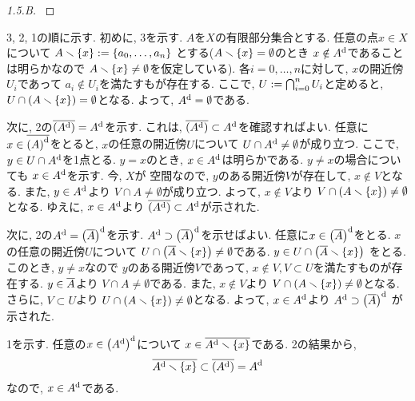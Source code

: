 \documentclass[uplatex, dvipdfmx, a4paper, 12pt, class=jsarticle, crop=false]{standalone}
\begin{document}
\begin{proof}[1.5.B]\label{eng-1-5-B-proof}

\end{proof}
	3, 2, 1の順に示す.
	初めに, 3を示す.
	\( A \)を\( X \)の有限部分集合とする.
	任意の点\( x \in X \)について
	\( A \setminus \lrbrace{x} \defeq \lrbrace{a_0, \ldots, a_n} \)
	とする(\( A \setminus \lrbrace{x} = \emptyset \)のとき
	\( x \notin A^{\mathrm{d}} \)であることは明らかなので
	\( A \setminus \lrbrace{x} \neq \emptyset \)を仮定している).
	各\( i = 0, \ldots, n \)に対して,
	\( x \)の開近傍\( U_i \)であって
	\( a_i \notin U_i \)を満たすもが存在する.
	ここで, \( U \mathrel{:=} \bigcap_{i=0}^n U_i \)と定めると,
	\( U \cap \lrparen{A \setminus \lrbrace{x}} = \emptyset \)となる.
	よって, \( A^{\mathrm{d}} = \emptyset \)である.

	次に, 2の\( \topbar{\lrparen{A^\topd}} = A^\topd \)を示す.
	これは, \( \topbar{\lrparen{A^\topd}}
	\subset A^\topd \)を確認すればよい.
	任意に\( x \in \topbar{\lrparen{A}^\topd} \)をとると,
	\( x \)の任意の開近傍\( U \)について
	\( U \cap A^{\mathrm{d}} \neq \emptyset \)が成り立つ.
	ここで, \( y \in U \cap A^{\mathrm{d}} \)を1点とる.
	\( y = x \)のとき, \( x \in A^{\mathrm{d}} \)は明らかである.
	\( y \neq x \)の場合についても
	\( x \in A^{\mathrm{d}} \)を示す.
	今, \( X \)が 空間なので,
	\( y \)のある開近傍\( V \)が存在して,
	\( x \notin V \)となる.
	また, \( y \in A^{\mathrm{d}} \)より
	\( V \cap A \neq \emptyset \)が成り立つ.
	よって, \( x \notin V \)より
	\( V \cap \lrparen{A \setminus \lrbrace{x}}
	\neq \emptyset \)となる.
	ゆえに, \( x \in A^{\mathrm{d}} \)より
	\( \topbar{\lrparen{A^\topd}}
	\subset A^\topd \)が示された.

	次に, 2の\( A^\topd = \lrparen{\topbar{A}}^\topd \)を示す.
	\( A^\topd \supset \lrparen{\topbar{A}}^\topd \)を示せばよい.
	任意に\( x \in \lrparen{\topbar{A}}^\topd \)をとる.
	\( x \)の任意の開近傍\( U \)について
	\( U \cap \lrparen{\topbar{A} \setminus \lrbrace{x}}
	\neq \emptyset \)である.
	\( y \in U \cap \lrparen{\topbar{A} \setminus \lrbrace{x}} \)
	をとる. このとき, \( y \neq x \)なので
	\( y \)のある開近傍\( V \)であって,
	\( x \notin V, V \subset U \)を満たすものが存在する.
	\( y \in \overline{A} \)より
	\( V \cap A \neq \emptyset \)である.
	また, \( x \notin V \)より
	\( V \cap \lrparen{A \setminus \lrbrace{x}}
	\neq \emptyset \)となる.
	さらに, \( V \subset U \)より
	\( U \cap \lrparen{A \setminus \lrbrace{x}}
	\neq \emptyset \)となる.
	よって, \( x \in A^{\mathrm{d}} \)より
	\( A^\topd \supset \lrparen{\topbar{A}}^\topd \)
	が示された.

	1を示す.
	任意の\( x \in \lrparen{A^\topd}^\topd \)について
	\( x \in \topbar{A^\topd \setminus \lrbrace{x}} \)である.
	2の結果から,
	\[ \topbar{A^\topd \setminus \lrbrace{x}}
	\subset \topbar{\lrparen{A^\topd}} = A^\topd \]
	なので, \( x \in A^{\mathrm{d}} \)である.
\end{document}
